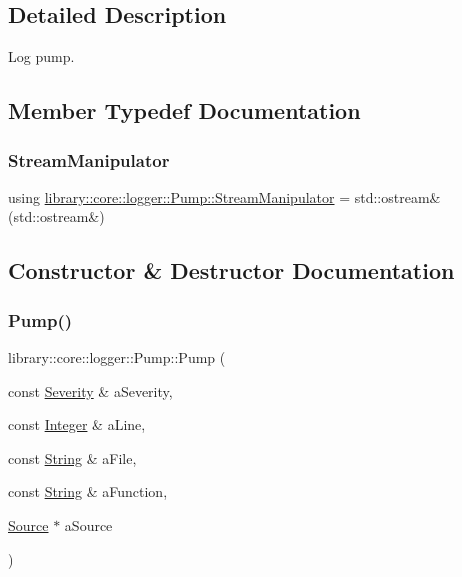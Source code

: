 \subsection{Detailed Description}
Log pump. 

\subsection{Member Typedef Documentation}
\mbox{\label{classlibrary_1_1core_1_1logger_1_1_pump_ab8990ff21e57c39977af471ddeb57637}} 
\subsubsection{\texorpdfstring{StreamManipulator}{StreamManipulator}}
{\footnotesize\ttfamily using \mbox{\hyperlink{classlibrary_1_1core_1_1logger_1_1_pump_ab8990ff21e57c39977af471ddeb57637}{library\+::core\+::logger\+::\+Pump\+::\+Stream\+Manipulator}} =  std\+::ostream\&(std\+::ostream\&)}



\subsection{Constructor \& Destructor Documentation}
\mbox{\label{classlibrary_1_1core_1_1logger_1_1_pump_af5c515afe6d1ca6c4f388235d4a79562}} 
\subsubsection{\texorpdfstring{Pump()}{Pump()}\hspace{0.1cm}{\footnotesize\ttfamily [1/3]}}
{\footnotesize\ttfamily library\+::core\+::logger\+::\+Pump\+::\+Pump (\begin{DoxyParamCaption}\item[{const \mbox{\hyperlink{namespacelibrary_1_1core_1_1logger_a35f71353edf64f68f7fe3874b01abaa8}{Severity}} \&}]{a\+Severity,  }\item[{const \mbox{\hyperlink{classlibrary_1_1core_1_1types_1_1_integer}{Integer}} \&}]{a\+Line,  }\item[{const \mbox{\hyperlink{classlibrary_1_1core_1_1types_1_1_string}{String}} \&}]{a\+File,  }\item[{const \mbox{\hyperlink{classlibrary_1_1core_1_1types_1_1_string}{String}} \&}]{a\+Function,  }\item[{\mbox{\hyperlink{classlibrary_1_1core_1_1logger_1_1_source}{Source}} $\ast$}]{a\+Source }\end{DoxyParamCaption})}

